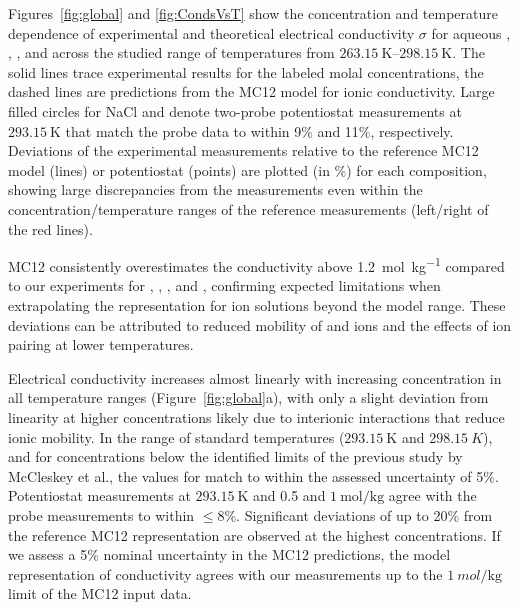 \documentclass[journal=aesccq,manuscript=article]{achemso}
\begin{document}
Figures~\ref{fig:global} and \ref{fig:CondsVsT} show the concentration and temperature dependence of experimental and theoretical electrical conductivity $\sigma$ for aqueous , , , and  across the studied range of temperatures from $\SIrange{263.15}{298.15}{\kelvin}$. 
The solid lines trace experimental results for the labeled molal concentrations, the dashed lines are predictions from the MC12\cite{McCleskey2012} model for ionic conductivity. 
Large filled circles for NaCl and  denote two-probe potentiostat measurements at $\SI{293,15}{\kelvin}$ that match the probe data to within 9\% and 11\%, respectively. 
Deviations of the experimental measurements relative to the reference MC12 model (lines) or potentiostat (points) are plotted (in \%) for each composition, showing large discrepancies from the measurements even within the concentration/temperature ranges of the reference measurements\cite{McCleskey_2011} (left/right of the red lines).

MC12 consistently overestimates the conductivity above \SI{1.2}{mol\per\kg} compared to our experiments for , , , and , confirming expected limitations when extrapolating the representation for  ion solutions beyond the model range. 
These deviations can be attributed to reduced mobility of  and  ions and the effects of ion pairing at lower temperatures.

Electrical conductivity increases almost linearly with increasing  concentration in all temperature ranges (Figure~\ref{fig:global}a), with only a slight deviation from linearity at higher concentrations likely due to interionic interactions that reduce ionic mobility\cite{Chattopadhyay2025, Mourouga2022Activity, Hemond2023Activity}. 
In the range of standard temperatures ($\SI{293.15}{\kelvin}$ and $\SI{298.15}{K}$), and for concentrations below the identified limits of the previous study by McCleskey et al.\cite{McCleskey_2011}, the values for  match to within the assessed uncertainty of 5\%. 
Potentiostat measurements at $\SI{293.15}{\kelvin}$ and 0.5 and $\SI{1}{\mol\per\kg}$ agree with the probe measurements to within $\leq8\%$. 
Significant deviations of up to 20\% from the reference MC12 representation are observed at the highest concentrations. 
If we assess a 5\% nominal uncertainty in the MC12 predictions, the model representation of conductivity agrees with our measurements up to the $\SI{1}{mol\per\kg}$ limit of the MC12 input data. 
\end{document}
